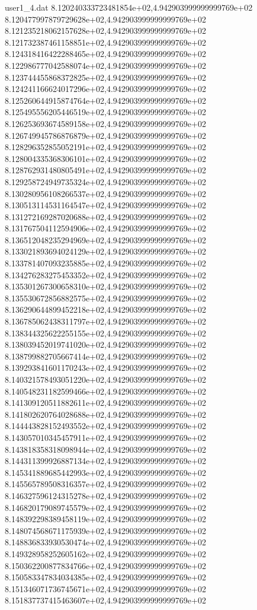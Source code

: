 \begin{filecontents}{user1_4.dat}
8.120240333723481854e+02,4.942903999999999769e+02
8.120477997879729628e+02,4.942903999999999769e+02
8.121235218062157628e+02,4.942903999999999769e+02
8.121732387461158851e+02,4.942903999999999769e+02
8.124318416422288465e+02,4.942903999999999769e+02
8.122986777042588074e+02,4.942903999999999769e+02
8.123744455868372825e+02,4.942903999999999769e+02
8.124241166624017296e+02,4.942903999999999769e+02
8.125260644915874764e+02,4.942903999999999769e+02
8.125495556205446519e+02,4.942903999999999769e+02
8.126253693674589158e+02,4.942903999999999769e+02
8.126749945786876879e+02,4.942903999999999769e+02
8.128296352855052191e+02,4.942903999999999769e+02
8.128004335368306101e+02,4.942903999999999769e+02
8.128762931480805491e+02,4.942903999999999769e+02
8.129258724949735324e+02,4.942903999999999769e+02
8.130280956108266537e+02,4.942903999999999769e+02
8.130513114531164547e+02,4.942903999999999769e+02
8.131272169287020688e+02,4.942903999999999769e+02
8.131767504112594906e+02,4.942903999999999769e+02
8.136512048235294969e+02,4.942903999999999769e+02
8.133021893694024129e+02,4.942903999999999769e+02
8.133781407093235885e+02,4.942903999999999769e+02
8.134276283275453352e+02,4.942903999999999769e+02
8.135301267300658310e+02,4.942903999999999769e+02
8.135530672856882575e+02,4.942903999999999769e+02
8.136290644899452218e+02,4.942903999999999769e+02
8.136785062438311797e+02,4.942903999999999769e+02
8.138344325622255155e+02,4.942903999999999769e+02
8.138039452019741020e+02,4.942903999999999769e+02
8.138799882705667414e+02,4.942903999999999769e+02
8.139293841601170243e+02,4.942903999999999769e+02
8.140321578493051220e+02,4.942903999999999769e+02
8.140548231182599466e+02,4.942903999999999769e+02
8.141309120511882611e+02,4.942903999999999769e+02
8.141802620764028688e+02,4.942903999999999769e+02
8.144443828152493552e+02,4.942903999999999769e+02
8.143057010345457911e+02,4.942903999999999769e+02
8.143818358318098944e+02,4.942903999999999769e+02
8.144311399926887134e+02,4.942903999999999769e+02
8.145341889685442993e+02,4.942903999999999769e+02
8.145565789508316357e+02,4.942903999999999769e+02
8.146327596124315278e+02,4.942903999999999769e+02
8.146820179089745579e+02,4.942903999999999769e+02
8.148392298389458119e+02,4.942903999999999769e+02
8.148074568671175939e+02,4.942903999999999769e+02
8.148836833930530474e+02,4.942903999999999769e+02
8.149328958252605162e+02,4.942903999999999769e+02
8.150362200877834766e+02,4.942903999999999769e+02
8.150583347834034385e+02,4.942903999999999769e+02
8.151346071736745671e+02,4.942903999999999769e+02
8.151837737415463607e+02,4.942903999999999769e+02

\end{filecontents}
